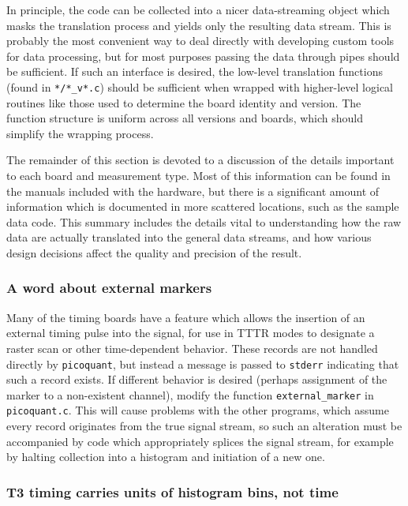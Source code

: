 \documentclass{article}
\newcommand{\stderr}{\texttt{stderr}}
\newcommand{\picoquant}{\texttt{picoquant}}
\begin{document}
In principle, the code can be collected into a nicer data-streaming object which masks the translation process and yields only the resulting data stream. This is probably the most convenient way to deal directly with developing custom tools for data processing, but for most purposes passing the data through pipes should be sufficient. If such an interface is desired, the low-level translation functions (found in \texttt{*/*\_v*.c}) should be sufficient when wrapped with higher-level logical routines like those used to determine the board identity and version. The function structure is uniform across all versions and boards, which should simplify the wrapping process.

The remainder of this section is devoted to a discussion of the details important to each board and measurement type. Most of this information can be found in the manuals included with the hardware, but there is a significant amount of information which is documented in more scattered locations, such as the sample data code. This summary includes the details vital to understanding how the raw data are actually translated into the general data streams, and how various design decisions affect the quality and precision of the result.

\subsubsection{A word about external markers}
Many of the timing boards have a feature which allows the insertion of an external timing pulse into the signal, for use in TTTR modes to designate a raster scan or other time-dependent behavior. These records are not handled directly by \picoquant, but instead a message is passed to \stderr{} indicating that such a record exists. If different behavior is desired (perhaps assignment of the marker to a non-existent channel), modify the function \texttt{external\_marker} in \texttt{picoquant.c}. This will cause problems with the other programs, which assume every record originates from the true signal stream, so such an alteration must be accompanied by code which appropriately splices the signal stream, for example by halting collection into a histogram and initiation of a new one.

\subsubsection{T3 timing carries units of histogram bins, not time}
\end{document}
